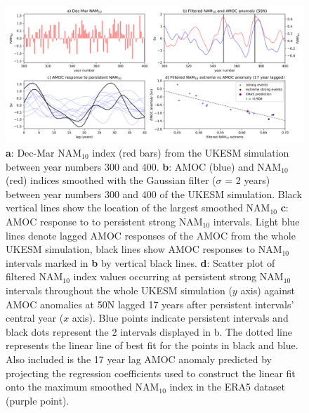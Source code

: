 \begin{figure}[h!]
\begin{center}
\noindent\includegraphics[width =\linewidth]{Figures/Figures-surface/AMOC_response_special_events.png} 
\caption{\textbf{a}: Dec-Mar NAM$_{10}$ index (red bars) from the UKESM simulation between year numbers 300 and 400. \textbf{b}: AMOC (blue) and NAM$_{10}$ (red) indices smoothed with the Gaussian filter ($\sigma$ = 2 years) between year numbers 300 and 400 of the UKESM simulation. Black vertical lines show the location of the largest smoothed NAM$_{10}$  \textbf{c}: AMOC response to to persistent strong NAM$_{10}$ intervals. Light blue lines denote lagged AMOC responses of the AMOC from the whole UKESM simulation, black lines show AMOC responses to NAM$_{10}$ intervals marked in \textbf{b} by vertical black lines. \textbf{d}: Scatter plot of filtered NAM$_{10}$ index values occurring at persistent strong NAM$_{10}$ intervals throughout the whole UKESM simulation ($y$ axis) against AMOC anomalies at 50N lagged 17 years after persistent intervals' central year ($x$ axis). Blue points indicate persistent intervals and black dots represent the 2 intervals displayed in b. The dotted line represents the linear line of best fit for the points in black and blue. Also included is the 17 year lag AMOC anomaly predicted by projecting the regression coefficients used to construct the linear fit onto the maximum smoothed NAM$_{10}$ index in the ERA5 dataset (purple point).}
\label{special_events}
\end{center}
\end{figure}

